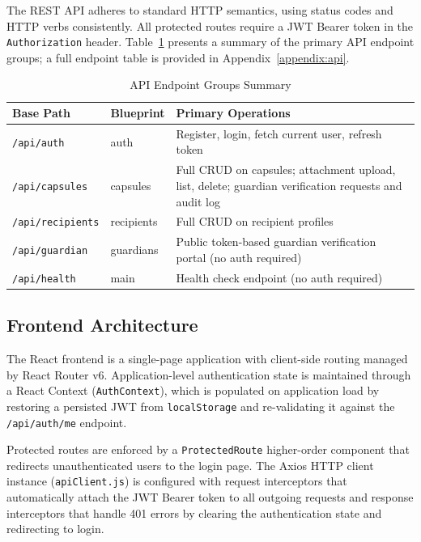 \documentclass[12pt, a4paper]{article}
\begin{document}
The REST API adheres to standard HTTP semantics, using status codes and HTTP verbs consistently. All protected routes require a JWT Bearer token in the \texttt{Authorization} header. Table~\ref{tab:api_overview} presents a summary of the primary API endpoint groups; a full endpoint table is provided in Appendix~\ref{appendix:api}.

\begin{table}[H]
  \centering
  \caption{API Endpoint Groups Summary}
  \label{tab:api_overview}
  \begin{tabularx}{\textwidth}{|l|l|X|}
  \hline
  \textbf{Base Path} & \textbf{Blueprint} & \textbf{Primary Operations} \\
  \hline
  \texttt{/api/auth} & auth & Register, login, fetch current user, refresh token \\
  \hline
  \texttt{/api/capsules} & capsules & Full CRUD on capsules; attachment upload, list, delete; guardian verification requests and audit log \\
  \hline
  \texttt{/api/recipients} & recipients & Full CRUD on recipient profiles \\
  \hline
  \texttt{/api/guardian} & guardians & Public token-based guardian verification portal (no auth required) \\
  \hline
  \texttt{/api/health} & main & Health check endpoint (no auth required) \\
  \hline
  \end{tabularx}
\end{table}

\subsection{Frontend Architecture}

The React frontend is a single-page application with client-side routing managed by React Router v6. Application-level authentication state is maintained through a React Context (\texttt{AuthContext}), which is populated on application load by restoring a persisted JWT from \texttt{localStorage} and re-validating it against the \texttt{/api/auth/me} endpoint.

Protected routes are enforced by a \texttt{ProtectedRoute} higher-order component that redirects unauthenticated users to the login page. The Axios HTTP client instance (\texttt{apiClient.js}) is configured with request interceptors that automatically attach the JWT Bearer token to all outgoing requests and response interceptors that handle 401 errors by clearing the authentication state and redirecting to login.
\end{document}
